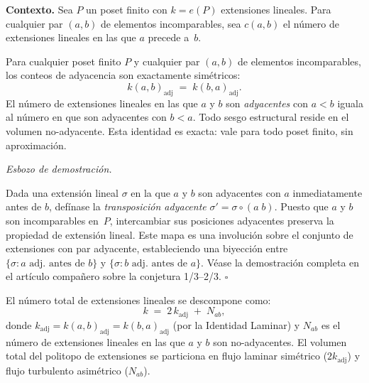 \documentclass[11pt, a4paper, openany]{book}
\renewenvironment{proof}[1][Demostraci\'on]{%
  \par\noindent\textit{#1.}\quad
}{\hfill$\square$\par\medskip}
\begin{document}
\bigskip
\noindent\textbf{Contexto.} Sea $P$ un poset finito con
$k = e(P)$ extensiones lineales. Para cualquier par $(a, b)$ de
elementos incomparables, sea $c(a,b)$ el n\'umero de extensiones
lineales en las que $a$ precede a~$b$.

\begin{theorem}
\label{thm:laminar-identity}
Para cualquier poset finito $P$ y cualquier par $(a, b)$ de elementos
incomparables, los conteos de adyacencia son exactamente sim\'etricos:
\begin{equation}
\label{eq:laminar-identity}
  k(a,b)_{\mathrm{adj}} \;=\; k(b,a)_{\mathrm{adj}}.
\end{equation}
El n\'umero de extensiones lineales en las que $a$ y $b$ son
\emph{adyacentes} con $a < b$ iguala al n\'umero en que son
adyacentes con $b < a$. Todo sesgo estructural reside en el volumen
no-adyacente. Esta identidad es exacta: vale para todo poset finito,
sin aproximaci\'on.
\end{theorem}

\begin{proof}[Esbozo de demostraci\'on]
Dada una extensi\'on lineal $\sigma$ en la que $a$ y $b$ son adyacentes
con $a$ inmediatamente antes de $b$, def\'inase la
\emph{transposici\'on adyacente} $\sigma' = \sigma \circ (a\;b)$.
Puesto que $a$ y $b$ son incomparables en~$P$, intercambiar sus
posiciones adyacentes preserva la propiedad de extensi\'on lineal. Este
mapa es una involuci\'on sobre el conjunto de extensiones con par
adyacente, estableciendo una biyecci\'on entre
$\{\sigma : a \text{ adj.\ antes de } b\}$ y
$\{\sigma : b \text{ adj.\ antes de } a\}$.
V\'ease la demostraci\'on completa en el art\'iculo compa\~nero sobre
la conjetura 1/3--2/3.
\end{proof}

\begin{theorem}
\label{thm:volumetric-partition}
El n\'umero total de extensiones lineales se descompone como:
\begin{equation}
\label{eq:volumetric-partition}
  k \;=\; 2\,k_{\mathrm{adj}} \;+\; N_{ab},
\end{equation}
donde $k_{\mathrm{adj}} = k(a,b)_{\mathrm{adj}} =
k(b,a)_{\mathrm{adj}}$ (por la Identidad Laminar) y $N_{ab}$ es el
n\'umero de extensiones lineales en las que $a$ y $b$ son
no-adyacentes. El volumen total del politopo de extensiones se
particiona en flujo laminar sim\'etrico ($2k_{\mathrm{adj}}$) y flujo
turbulento asim\'etrico ($N_{ab}$).
\end{theorem}
\end{document}
